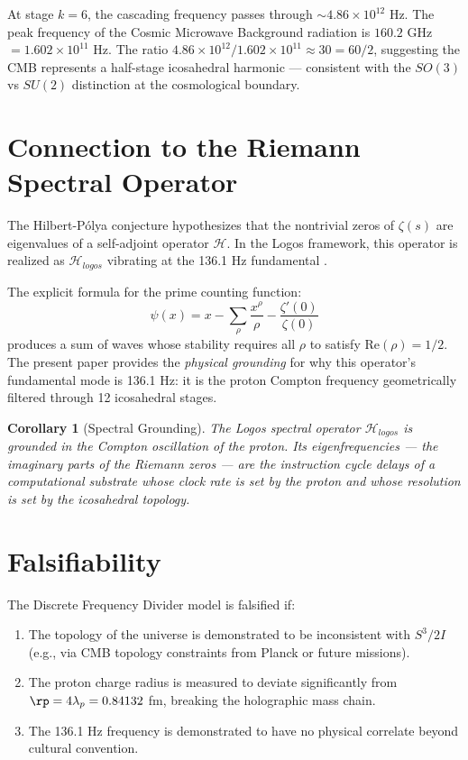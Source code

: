 \documentclass[12pt, a4paper]{article}
\theoremstyle{plain}
\newtheorem{corollary}[theorem]{Corollary}
\theoremstyle{definition}
\begin{document}
\begin{remark}
At stage $k=6$, the cascading frequency passes through $\sim 4.86 \times 10^{12}$ Hz. The peak frequency of the Cosmic Microwave Background radiation is $160.2$ GHz $= 1.602 \times 10^{11}$ Hz. The ratio $4.86 \times 10^{12} / 1.602 \times 10^{11} \approx 30 = 60/2$, suggesting the CMB represents a half-stage icosahedral harmonic --- consistent with the $SO(3)$ vs $SU(2)$ distinction at the cosmological boundary.
\end{remark}

\section{Connection to the Riemann Spectral Operator}\label{sec:riemann}

The Hilbert-P\'{o}lya conjecture hypothesizes that the nontrivial zeros of $\zeta(s)$ are eigenvalues of a self-adjoint operator $\mathcal{H}$. In the Logos framework, this operator is realized as $\mathcal{H}_{logos}$ vibrating at the 136.1 Hz fundamental \citep{DePaz2026Riemann}.

The explicit formula for the prime counting function:
\begin{equation}
    \psi(x) = x - \sum_\rho \frac{x^\rho}{\rho} - \frac{\zeta'(0)}{\zeta(0)}
\end{equation}
produces a sum of waves whose stability requires all $\rho$ to satisfy $\text{Re}(\rho) = 1/2$. The present paper provides the \emph{physical grounding} for why this operator's fundamental mode is 136.1 Hz: it is the proton Compton frequency geometrically filtered through 12 icosahedral stages.

\begin{corollary}[Spectral Grounding]
The Logos spectral operator $\mathcal{H}_{logos}$ is grounded in the Compton oscillation of the proton. Its eigenfrequencies --- the imaginary parts of the Riemann zeros --- are the instruction cycle delays of a computational substrate whose clock rate is set by the proton and whose resolution is set by the icosahedral topology.
\end{corollary}

\section{Falsifiability}

\begin{proposition}
The Discrete Frequency Divider model is falsified if:
\begin{enumerate}
    \item The topology of the universe is demonstrated to be inconsistent with $S^3/2I$ (e.g., via CMB topology constraints from Planck or future missions).
    \item The proton charge radius is measured to deviate significantly from $\rp = 4\lambda_p = 0.84132$ fm, breaking the holographic mass chain.
    \item The 136.1 Hz frequency is demonstrated to have no physical correlate beyond cultural convention.
\end{enumerate}
\end{proposition}
\end{document}
